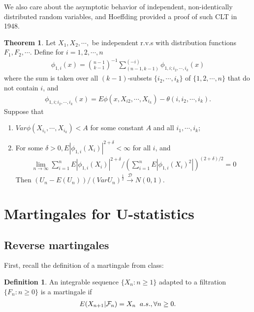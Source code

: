 \documentclass{article}
\theoremstyle{definition}
\newtheorem{theorem}{Theorem}
\newtheorem{Def}{Definition}
\numberwithin{Def}{section}
\begin{document}
    
    We also care about the asymptotic behavior of independent, non-identically distributed random variables, and Hoeffding provided a proof of such CLT in 1948. 
    \begin{theorem}
    Let $X_1, X_2, \cdots,$ be independent r.v.s with distribution functions $F_1, F_2, \cdots$. Define for $i = 1,2, \cdots, n$
    \begin{align}
        \phi_{1,i} (x) = {n-1 \choose k-1}^{-1} \sum_{(n-1, k-1)}^{(-i)} \phi_{1, i; i_2, \cdots, i_k}(x)
    \end{align}
    where the sum is taken over all $(k-1)$-subsets $\{i_2, \cdots, i_k\}$ of $\{1,2, \cdots, n\}$ that do not contain $i$, and 
    \begin{align}
        \phi_{1, i; i_2, \cdots, i_k}(x) = E \phi(x, X_{i2}, \cdots, X_{i_k}) - \theta(i, i_2, \cdots, i_k).
    \end{align}
    Suppose that 
    \begin{enumerate}[label = (\roman*)]
        \item $Var \phi(X_{i_1}, \cdots, X_{i_k} ) < A$ for some constant $A$ and all $i_1, \cdots, i_k$;
        \item For some $\delta > 0, E|\phi_{1, i} (X_i) |^{2 + \delta} < \infty$ for all $i$, and 
        \begin{align}
            \lim_{n \rightarrow \infty} \sum_{i =1}^{n} E|\phi_{1, i} (X_i) |^{2 + \delta} \Big/ (\sum_{i =1}^{n} E|\phi_{1, i} (X_i)^2 |) ^{(2 + \delta)/2} = 0
        \end{align}
       Then $(U_n - E(U_n)) / (Var U_n)^{\frac{1}{2}} \xrightarrow{\mathcal{D}} N(0,1).$ 
    \end{enumerate}
    \end{theorem}
\section{Martingales for U-statistics}
\subsection{Reverse martingales}
First, recall the definition of a martingale from class:
\begin{Def}
An integrable sequence $\{X_n: n\ge 1\}$ adapted to a filtration $\{F_n: n\ge 0\}$ is a martingale if
\begin{align*}
 E(X_{n+1}|\mathcal{F}_n)=X_n \hspace{0.2cm} a.s., \forall n\ge0.
\end{align*}
\end{Def}
\end{document}
